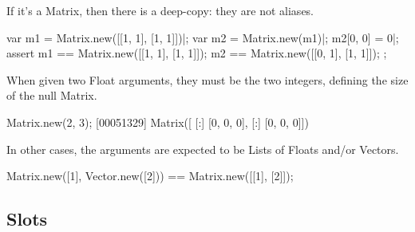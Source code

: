 If it's a Matrix, then there is a deep-copy: they are not aliases.

\begin{urbiscript}
var m1 = Matrix.new([[1, 1], [1, 1]])|;
var m2 = Matrix.new(m1)|;
m2[0, 0] = 0|;
assert
{
  m1 == Matrix.new([[1, 1], [1, 1]]);
  m2 == Matrix.new([[0, 1], [1, 1]]);
};
\end{urbiscript}

When given two Float arguments, they must be the two integers, defining the
size of the null Matrix.
\begin{urbiscript}
Matrix.new(2, 3);
[00051329] Matrix([
[:]  [0, 0, 0],
[:]  [0, 0, 0]])
\end{urbiscript}

In other cases, the arguments are expected to be Lists of Floats and/or
Vectors.

\begin{urbiassert}
Matrix.new([1], Vector.new([2])) == Matrix.new([[1], [2]]);
\end{urbiassert}

\subsection{Slots}

